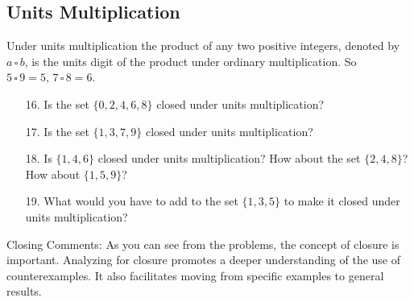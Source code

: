 \documentclass[12pt]{book}
\theoremstyle{definition}
\begin{document}
\subsection{Units Multiplication}
Under units multiplication the product of any two positive integers, denoted by $a\,\square\, b$, is the units digit of the product under ordinary multiplication.  So $5\,\square\,9=5,\, 7\,\square\,8=6$.
\begin{enumerate}
	\item[16.] Is the set $\{0,2,4,6,8\}$ closed under units multiplication?
	\item[17.]Is the set $\{1,3,7,9\}$ closed under units multiplication?
	\item[18.]Is $\{1,4,6\}$ closed under units multiplication?  How about the set $\{2,4,8\}$?  How about $\{1,5,9\}$?
	\item[19.]What would you have to add to the set $\{1,3,5\}$ to make it closed under units multiplication?
\end{enumerate}
\clearpage

Closing Comments: As you can see from the problems, the concept of closure is important. Analyzing for closure promotes a deeper understanding of the use of counterexamples. It also facilitates moving from specific examples to general results. \\
\end{document}
